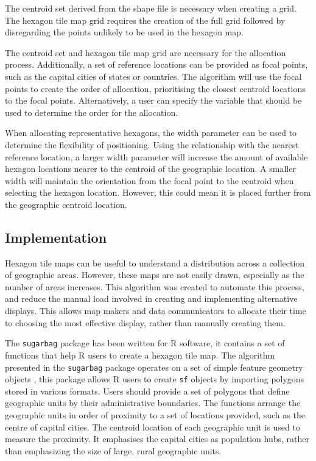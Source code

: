 The centroid set derived from the shape file is necessary when creating
a grid. The hexagon tile map grid requires the creation of the full grid
followed by disregarding the points unlikely to be used in the hexagon
map.

The centroid set and hexagon tile map grid are necessary for the
allocation process. Additionally, a set of reference locations can be
provided as focal points, such as the capital cities of states or
countries. The algorithm will use the focal points to create the order
of allocation, prioritising the closest centroid locations to the focal
points. Alternatively, a user can specify the variable that should be
used to determine the order for the allocation.

When allocating representative hexagons, the width parameter can be used
to determine the flexibility of positioning. Using the relationship with
the nearest reference location, a larger width parameter will increase
the amount of available hexagon locations nearer to the centroid of the
geographic location. A smaller width will maintain the orientation from
the focal point to the centroid when selecting the hexagon location.
However, this could mean it is placed further from the geographic
centroid location.

\hypertarget{implementation}{%
\subsection{Implementation}\label{implementation}}

Hexagon tile maps can be useful to understand a distribution across a
collection of geographic areas. However, these maps are not easily
drawn, especially as the number of areas increases. This algorithm was
created to automate this process, and reduce the manual load involved in
creating and implementing alternative displays. This allows map makers
and data communicators to allocate their time to choosing the most
effective display, rather than manually creating them.

The \texttt{sugarbag} package has been written for R software, it
contains a set of functions that help R users to create a hexagon tile
map. The algorithm presented in the \texttt{sugarbag} package operates
on a set of simple feature geometry objects \citep{sf}, this package
allows R users to create \texttt{sf} objects by importing polygons
stored in various formats. Users should provide a set of polygons that
define geographic units by their administrative boundaries. The
functions arrange the geographic units in order of proximity to a set of
locations provided, such as the centre of capital cities. The centroid
location of each geographic unit is used to measure the proximity. It
emphasises the capital cities as population hubs, rather than
emphasizing the size of large, rural geographic units.

